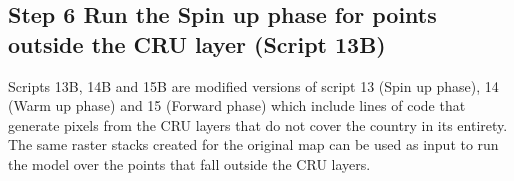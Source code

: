 \documentclass[
  10pt,
  b5paper,
]{book}
\begin{document}
\hypertarget{step-6-run-the-spin-up-phase-for-points-outside-the-cru-layer-script-13b}{%
\subsection{Step 6 Run the Spin up phase for points outside the CRU layer (Script 13B)}\label{step-6-run-the-spin-up-phase-for-points-outside-the-cru-layer-script-13b}}

Scripts 13B, 14B and 15B are modified versions of script 13 (Spin up phase), 14 (Warm up phase) and 15 (Forward phase) which include lines of code that generate pixels from the CRU layers that do not cover the country in its entirety. The same raster stacks created for the original map can be used as input to run the model over the points that fall outside the CRU layers.
\end{document}
